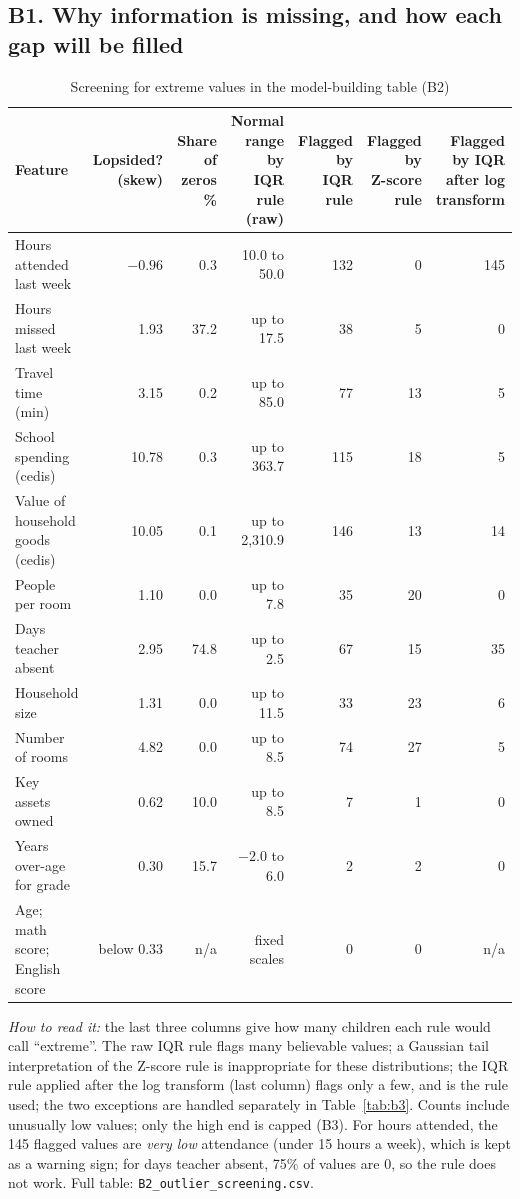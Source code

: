 \documentclass[conference,a4paper]{IEEEtran}
\newcommand{\var}[1]{\texttt{#1}}
\newcommand{\tabnote}[1]{\par\vspace{3pt}\begin{minipage}{\linewidth}\footnotesize\raggedright #1\end{minipage}}
\begin{document}
\subsection*{B1. Why information is missing, and how each gap will be filled}
\begin{table}[!t]
\centering
\caption{Screening for extreme values in the model-building table (B2)}
\label{tab:b2}
\footnotesize
\setlength{\tabcolsep}{5pt}
\begin{tabular}{lrrrrrr}
\toprule
Feature & \makecell{Lopsided?\\(skew)} & \makecell{Share of\\zeros \%} & \makecell{Normal range by\\IQR rule (raw)} & \makecell{Flagged by\\IQR rule} & \makecell{Flagged by\\Z-score rule} & \makecell{Flagged by IQR\\after log transform} \\
\midrule
Hours attended last week & $-0.96$ & 0.3 & 10.0 to 50.0 & 132 & 0 & 145 \\
Hours missed last week & 1.93 & 37.2 & up to 17.5 & 38 & 5 & 0 \\
Travel time (min) & 3.15 & 0.2 & up to 85.0 & 77 & 13 & 5 \\
School spending (cedis) & 10.78 & 0.3 & up to 363.7 & 115 & 18 & 5 \\
Value of household goods (cedis) & 10.05 & 0.1 & up to 2,310.9 & 146 & 13 & 14 \\
People per room & 1.10 & 0.0 & up to 7.8 & 35 & 20 & 0 \\
Days teacher absent & 2.95 & 74.8 & up to 2.5 & 67 & 15 & 35 \\
Household size & 1.31 & 0.0 & up to 11.5 & 33 & 23 & 6 \\
Number of rooms & 4.82 & 0.0 & up to 8.5 & 74 & 27 & 5 \\
Key assets owned & 0.62 & 10.0 & up to 8.5 & 7 & 1 & 0 \\
Years over-age for grade & 0.30 & 15.7 & $-2.0$ to 6.0 & 2 & 2 & 0 \\
Age; math score; English score & below 0.33 & n/a & fixed scales & 0 & 0 & n/a \\
\bottomrule
\end{tabular}
\tabnote{\emph{How to read it:} the last three columns give how many children each rule would call ``extreme''. The raw IQR rule flags many believable values; a Gaussian tail interpretation of the Z-score rule is inappropriate for these distributions; the IQR rule applied after the log transform (last column) flags only a few, and is the rule used; the two exceptions are handled separately in Table~\ref{tab:b3}. Counts include unusually low values; only the high end is capped (B3). For hours attended, the 145 flagged values are \emph{very low} attendance (under 15 hours a week), which is kept as a warning sign; for days teacher absent, 75\% of values are 0, so the rule does not work. Full table: \var{B2\_outlier\_screening.csv}.}
\end{table}
\end{document}
